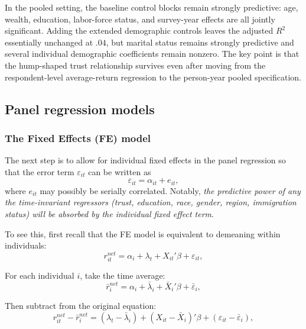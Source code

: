 \FloatBarrier

\par In the pooled setting, the baseline control blocks remain strongly predictive: age, wealth, education, labor-force status, and survey-year effects are all jointly significant. Adding the extended demographic controls leaves the adjusted $R^2$ essentially unchanged at $.04$, but marital status remains strongly predictive and several individual demographic coefficients remain nonzero. The key point is that the hump-shaped trust relationship survives even after moving from the respondent-level average-return regression to the person-year pooled specification.

\subsection{Panel regression models}

\subsubsection{The Fixed Effects (FE) model}

\par The next step is to allow for individual fixed effects in the panel regression so that the error term $\varepsilon_{it}$ can be written as \[\varepsilon_{it} = \alpha_{it} + e_{it},\] where $e_{it}$ may possibly be serially correlated. Notably, \textit{the predictive power of any the time-invariant regressors (trust, education, race, gender, region, immigration status) will be absorbed by the individual fixed effect term}. 

\par To see this, first recall that the FE model is equivalent to demeaning within individuals:
\[
r^{net}_{it} = \alpha_i + \lambda_t + X_{it}'\beta + \varepsilon_{it},
\]

\par For each individual $i$, take the time average:
\[
\bar{r}^{net}_i = \alpha_i + \bar{\lambda}_i + \bar{X}_i'\beta + \bar{\varepsilon}_i,
\]

\par Then subtract from the original equation:
\[
r^{net}_{it} - \bar{r}^{net}_i
=
\left(\lambda_t - \bar{\lambda}_i\right)
+ \left(X_{it} - \bar{X}_i\right)'\beta
+ \left(\varepsilon_{it} - \bar{\varepsilon}_i\right),
\]

